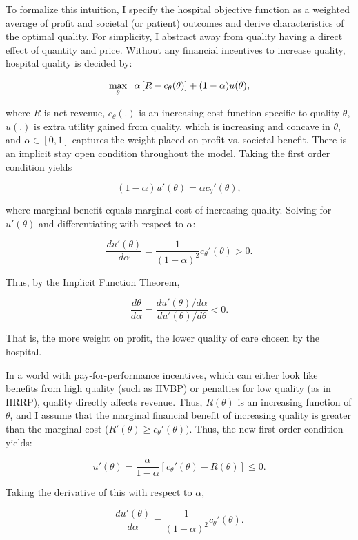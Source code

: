 \documentclass[12pt]{article}
\begin{document}
    To formalize this intuition, I specify the hospital objective function as a weighted average of profit and societal (or patient) outcomes and derive characteristics of the optimal quality. For simplicity, I abstract away from quality having a direct effect of quantity and price. Without any financial incentives to increase quality, hospital quality is decided by:  
    
    $$\max_{\theta}\hspace{2mm}\alpha\left[R - c_{\theta}(\theta) \right] + (1-\alpha) u(\theta),$$

    \noindent where $R$ is net revenue, $c_{\theta}(.)$ is an increasing cost function specific to quality $\theta$, $u(.)$ is extra utility gained from quality, which is increasing and concave in $\theta$, and $\alpha\in[0,1]$ captures the weight placed on profit vs. societal benefit. There is an implicit stay open condition throughout the model. Taking the first order condition yields 

    $$(1-\alpha)u'(\theta) = \alpha c_{\theta}'(\theta),$$

    \noindent where marginal benefit equals marginal cost of increasing quality. Solving for $u'(\theta)$ and differentiating with respect to $\alpha$:

    $$\frac{du'(\theta)}{d\alpha} = \frac{1}{(1-\alpha)^2}c_{\theta}'(\theta) > 0.$$

    \noindent Thus, by the Implicit Function Theorem, 

    $$\frac{d\theta}{d\alpha} = \frac{du'(\theta)/d\alpha}{du'(\theta)/d\theta} < 0.$$

    \noindent That is, the more weight on profit, the lower quality of care chosen by the hospital.

    In a world with pay-for-performance incentives, which can either look like benefits from high quality (such as HVBP) or penalties for low quality (as in HRRP), quality directly affects revenue. Thus, $R(\theta)$ is an increasing function of $\theta$, and I assume that the marginal financial benefit of increasing quality is greater than the marginal cost ($R'(\theta)\geq c_{\theta}'(\theta))$. Thus, the new first order condition yields:

    $$u'(\theta) = \frac{\alpha}{1-\alpha} \left[c_{\theta}'(\theta)-R(\theta)\right] \leq 0.$$

    \noindent Taking the derivative of this with respect to $\alpha$,

    $$\frac{du'(\theta)}{d\alpha} = \frac{1}{(1-\alpha)^2}c_{\theta}'(\theta).$$
\end{document}
